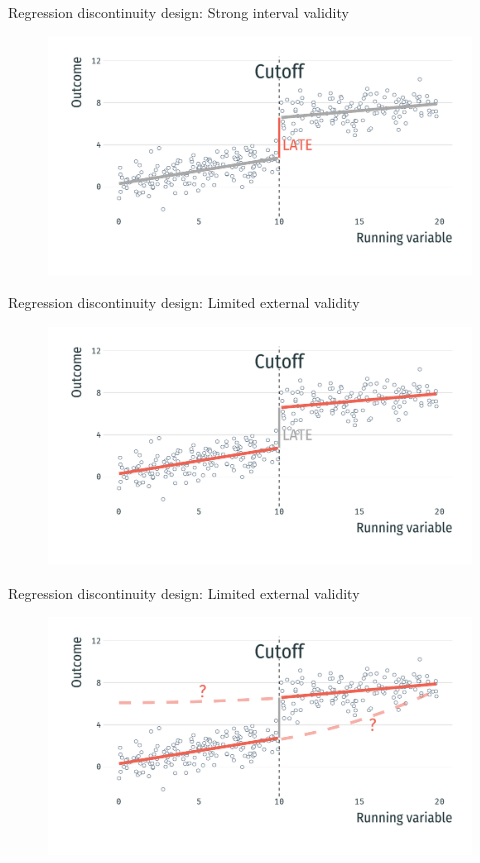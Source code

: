 \documentclass[usenames,dvipsnames,11pt,aspectratio=169]{beamer}
\begin{document}
\begin{frame}{Regression discontinuity design: Strong interval validity}
\begin{figure}[!htb]
\centering
    \includegraphics[width=.9\textwidth]{figures/ex2.pdf}
\end{figure}
\end{frame}

\begin{frame}{Regression discontinuity design: Limited external validity}
\begin{figure}[!htb]
\centering
    \includegraphics[width=.9\textwidth]{figures/ex3.pdf}
\end{figure}
\end{frame}

\begin{frame}{Regression discontinuity design: Limited external validity}
\begin{figure}[!htb]
\centering
    \includegraphics[width=.9\textwidth]{figures/ex3b.pdf}
\end{figure}
\end{frame}
\end{document}
